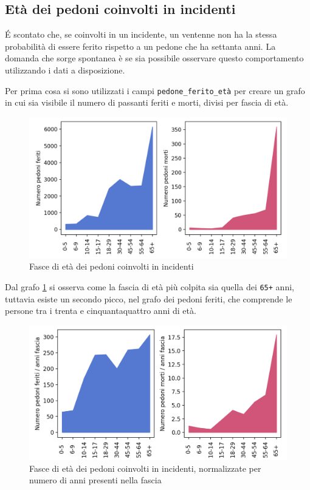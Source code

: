 \documentclass[a4paper,12pt]{report}
\newcommand{\columnstyle}[1]{\texttt{#1}}
\begin{document}
\subsection{Età dei pedoni coinvolti in incidenti}

\'E scontato che, se coinvolti in un incidente, un ventenne non ha la stessa 
probabilità di essere ferito rispetto a un pedone che ha settanta anni.
La domanda che sorge spontanea è se sia possibile osservare questo comportamento 
utilizzando i dati a disposizione.

Per prima cosa si sono utilizzati i campi \columnstyle{pedone\_ferito\_età} 
per creare un grafo in cui sia visibile il numero di passanti feriti e morti, 
divisi per fascia di età.

\begin{figure}
    \includegraphics[width=\linewidth]{../src/incidenti/incidenti_senza_coords/pedoni/eta_pedoni_iniziale.png}
    \caption{Fasce di età dei pedoni coinvolti in incidenti}
    \label{fig:eta-pedoni-iniziale}
\end{figure}

Dal grafo \ref{fig:eta-pedoni-iniziale} si osserva come la fascia di età più colpita 
sia quella dei \columnstyle{65+} anni, tuttavia esiste un secondo picco, nel grafo dei 
pedoni feriti, che comprende le persone tra i trenta e cinquantaquattro anni di età.

\begin{figure}
    \includegraphics[width=\linewidth]{../src/incidenti/incidenti_senza_coords/pedoni/eta_pedoni.png}
    \caption{Fasce di età dei pedoni coinvolti in incidenti, normalizzate per numero di anni 
    presenti nella fascia}
    \label{fig:eta-pedoni}
\end{figure}
\end{document}
